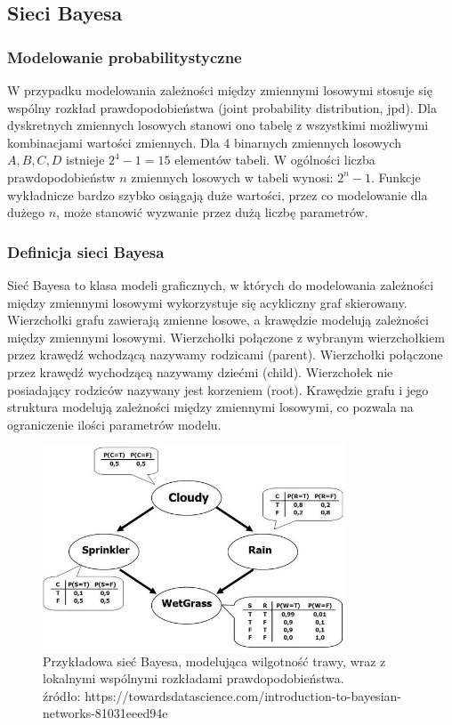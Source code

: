 \documentclass[12pt]{article}
\begin{document}
\subsection{Sieci Bayesa}

\subsubsection{Modelowanie probabilitystyczne}
W przypadku modelowania zależności między zmiennymi losowymi stosuje się wspólny rozkład prawdopodobieństwa (joint probability distribution, jpd). Dla dyskretnych zmiennych losowych stanowi ono tabelę z wszystkimi możliwymi kombinacjami wartości zmiennych. Dla 4 binarnych zmiennych losowych $A, B, C, D$ istnieje $2^4-1 = 15$ elementów tabeli. W ogólności liczba prawdopodobieństw $n$ zmiennych losowych w tabeli wynosi: $2^n - 1$. Funkcje wykładnicze bardzo szybko osiągają duże wartości, przez co modelowanie dla dużego $n$, może stanowić wyzwanie przez dużą liczbę parametrów.

\subsubsection{Definicja sieci Bayesa}
Sieć Bayesa to klasa modeli graficznych, w których do modelowania zależności między zmiennymi losowymi wykorzystuje się acykliczny graf skierowany. Wierzchołki grafu zawierają zmienne losowe, a krawędzie modelują zależności między zmiennymi losowymi. Wierzchołki połączone z wybranym wierzchołkiem przez krawędź wchodzącą nazywamy rodzicami (parent). Wierzchołki połączone przez krawędź wychodzącą nazywamy dziećmi (child). Wierzchołek nie posiadający rodziców nazywany jest korzeniem (root). Krawędzie grafu i jego struktura modelują zależności między zmiennymi losowymi, co pozwala na ograniczenie ilości parametrów modelu.

\begin{figure}
\centering
	\includegraphics[width=0.80\textwidth]{net.jpeg}\par\vspace{1cm}
\caption{Przykładowa sieć Bayesa, modelująca wilgotność trawy, wraz z lokalnymi wspólnymi rozkładami prawdopodobieństwa. \\ źródło: https://towardsdatascience.com/introduction-to-bayesian-networks-81031eeed94e}
	\label{fig:net}
\end{figure}
\end{document}
